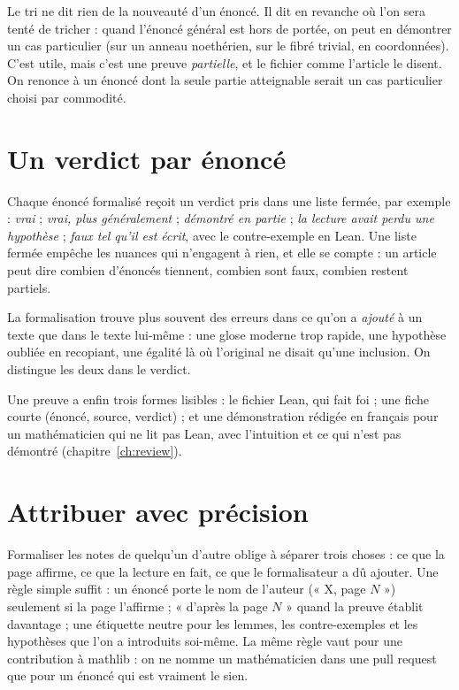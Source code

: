 Le tri ne dit rien de la nouveauté d'un énoncé. Il dit en revanche où l'on sera tenté de
tricher : quand l'énoncé général est hors de portée, on peut en démontrer un cas
particulier (sur un anneau noethérien, sur le fibré trivial, en coordonnées). C'est utile,
mais c'est une preuve \emph{partielle}, et le fichier comme l'article le disent. On renonce
à un énoncé dont la seule partie atteignable serait un cas particulier choisi par
commodité.

\section{Un verdict par énoncé}

Chaque énoncé formalisé reçoit un verdict pris dans une liste fermée, par exemple :
\emph{vrai} ; \emph{vrai, plus généralement} ; \emph{démontré en partie} ; \emph{la lecture
avait perdu une hypothèse} ; \emph{faux tel qu'il est écrit}, avec le contre-exemple en
Lean. Une liste fermée empêche les nuances qui n'engagent à rien, et elle se compte : un
article peut dire combien d'énoncés tiennent, combien sont faux, combien restent
partiels.

La formalisation trouve plus souvent des erreurs dans ce qu'on a \emph{ajouté} à un texte
que dans le texte lui-même : une glose moderne trop rapide, une hypothèse oubliée en
recopiant, une égalité là où l'original ne disait qu'une inclusion. On distingue les deux
dans le verdict.

Une preuve a enfin trois formes lisibles : le fichier Lean, qui fait foi ; une fiche
courte (énoncé, source, verdict) ; et une démonstration rédigée en français pour un
mathématicien qui ne lit pas Lean, avec l'intuition et ce qui n'est pas démontré
(chapitre~\ref{ch:review}).

\section{Attribuer avec précision}

Formaliser les notes de quelqu'un d'autre oblige à séparer trois choses : ce que la page
affirme, ce que la lecture en fait, ce que le formalisateur a dû ajouter. Une règle simple
suffit : un énoncé porte le nom de l'auteur (« X, page $N$ ») seulement si la page
l'affirme ; « d'après la page $N$ » quand la preuve établit davantage ; une étiquette
neutre pour les lemmes, les contre-exemples et les hypothèses que l'on a introduits
soi-même. La même règle vaut pour une contribution à mathlib : on ne nomme un
mathématicien dans une pull request que pour un énoncé qui est vraiment le sien.

